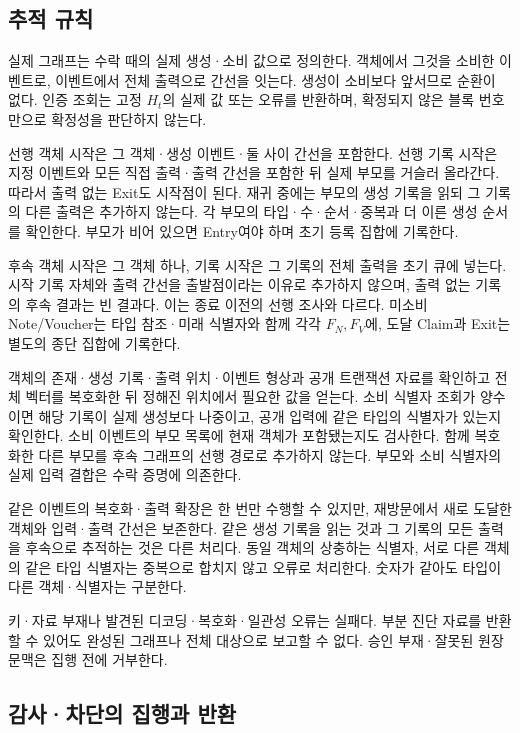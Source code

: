 \subsection{추적 규칙}
\label{app:trace-details}

실제 그래프는 수락 때의 실제 생성·소비 값으로 정의한다.
객체에서 그것을 소비한 이벤트로, 이벤트에서 전체 출력으로 간선을 잇는다.
생성이 소비보다 앞서므로 순환이 없다.
인증 조회는 고정 $H_t$의 실제 값 또는 오류를 반환하며,
확정되지 않은 블록 번호만으로 확정성을 판단하지 않는다.

선행 객체 시작은 그 객체·생성 이벤트·둘 사이 간선을 포함한다.
선행 기록 시작은 지정 이벤트와 모든 직접 출력·출력 간선을 포함한 뒤
실제 부모를 거슬러 올라간다. 따라서 출력 없는 Exit도 시작점이 된다.
재귀 중에는 부모의 생성 기록을 읽되 그 기록의 다른 출력은 추가하지 않는다.
각 부모의 타입·수·순서·중복과 더 이른 생성 순서를 확인한다.
부모가 비어 있으면 Entry여야 하며 초기 등록 집합에 기록한다.

후속 객체 시작은 그 객체 하나, 기록 시작은 그 기록의 전체 출력을
초기 큐에 넣는다. 시작 기록 자체와 출력 간선을 출발점이라는 이유로
추가하지 않으며, 출력 없는 기록의 후속 결과는 빈 결과다.
이는 종료 이전의 선행 조사와 다르다.
미소비 Note/Voucher는 타입 참조·미래 식별자와 함께 각각 $F_N,F_V$에,
도달 Claim과 Exit는 별도의 종단 집합에 기록한다.

객체의 존재·생성 기록·출력 위치·이벤트 형상과 공개 트랜잭션 자료를
확인하고 전체 벡터를 복호화한 뒤 정해진 위치에서 필요한 값을 얻는다.
소비 식별자 조회가 양수이면 해당 기록이 실제 생성보다 나중이고,
공개 입력에 같은 타입의 식별자가 있는지 확인한다.
소비 이벤트의 부모 목록에 현재 객체가 포함됐는지도 검사한다.
함께 복호화한 다른 부모를 후속 그래프의 선행 경로로 추가하지 않는다.
부모와 소비 식별자의 실제 입력 결합은 수락 증명에 의존한다.

같은 이벤트의 복호화·출력 확장은 한 번만 수행할 수 있지만,
재방문에서 새로 도달한 객체와 입력·출력 간선은 보존한다.
같은 생성 기록을 읽는 것과 그 기록의 모든 출력을 후속으로
추적하는 것은 다른 처리다.
동일 객체의 상충하는 식별자, 서로 다른 객체의 같은 타입 식별자는
중복으로 합치지 않고 오류로 처리한다.
숫자가 같아도 타입이 다른 객체·식별자는 구분한다.

키·자료 부재나 발견된 디코딩·복호화·일관성 오류는 실패다.
부분 진단 자료를 반환할 수 있어도 완성된 그래프나 전체 대상으로
보고할 수 없다. 승인 부재·잘못된 원장 문맥은 집행 전에 거부한다.

\subsection{감사·차단의 집행과 반환}
\label{app:freeze-execution}

